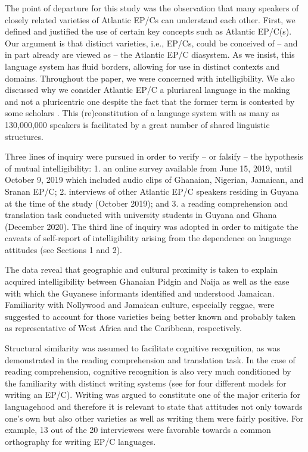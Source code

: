 \documentclass[output=paper,colorlinks,citecolor=brown]{langscibook}
\begin{document}
The point of departure for this study was the observation that many speakers of closely related varieties of Atlantic EP/Cs can understand each other. First, we defined and justified the use of certain key concepts such as Atlantic EP/C(s). Our argument is that distinct varieties, i.e., EP/Cs, could be conceived of – and in part already are viewed as – the Atlantic EP/C diasystem. As we insist, this language system has fluid borders, allowing for use in distinct contexts and domains. Throughout the paper, we were concerned with intelligibility. We also discussed why we consider Atlantic EP/C a pluriareal language in the making and not a pluricentric one despite the fact that the former term is contested by some scholars \citep[e.g.,][7]{Dollinger_2016}. This (re)constitution of a language system with as many as 130,000,000 speakers is facilitated by a great number of shared linguistic structures.

Three lines of inquiry were pursued in order to verify – or falsify – the hypothesis of mutual intelligibility: 1. an online survey available from June 15, 2019, until October 9, 2019 which included audio clips of Ghanaian, Nigerian, Jamaican, and Sranan EP/C; 2. interviews of other Atlantic EP/C speakers residing in Guyana at the time of the study (October 2019); and 3. a reading comprehension and translation task conducted with university students in Guyana and Ghana (December 2020). The third line of inquiry was adopted in order to mitigate the caveats of self-report of intelligibility arising from the dependence on language attitudes (see Sections 1 and 2).

The data reveal that geographic and cultural proximity is taken to explain acquired intelligibility between Ghanaian Pidgin and Naija as well as the ease with which the Guyanese informants identified and understood Jamaican. Familiarity with Nollywood and Jamaican culture, especially reggae, were suggested to account for those varieties being better known and probably taken as representative of West Africa and the Caribbean, respectively.

Structural similarity was assumed to facilitate cognitive recognition, as was demonstrated in the reading comprehension and translation task. In the case of reading comprehension, cognitive recognition is also very much conditioned by the familiarity with distinct writing systems (see \cite{Winer_1990} for four different models for writing an EP/C). Writing was argued to constitute one of the major criteria for languagehood and therefore it is relevant to state that attitudes not only towards one’s own but also other varieties as well as writing them were fairly positive. For example, 13 out of the 20 interviewees were favorable towards a common orthography for writing EP/C languages. 
\end{document}
